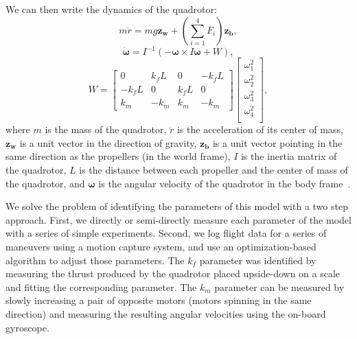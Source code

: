 We can then write the dynamics of the quadrotor:\begin{equation} \label{eq: dynamics_1}
m\ddot{r} = mg\boldsymbol{z_{w}} + (\sum_{i=1}^{4}F_{i})\boldsymbol{z_{b}},
\end{equation}\begin{equation} \label{eq: dynamics_2}
\boldsymbol{\dot{\omega}} = I_{}^{-1}(-\boldsymbol{\omega} \times I\boldsymbol{\omega} + W),
\end{equation}\begin{equation} \label{eq: dynamics_3}
W = \begin{bmatrix}
0 & k_{f}L & 0  & -k_{f}L \\ 
-k_{f}L & 0 & k_{f}L  &  0\\ 
k_m & -k_m & k_m & -k_m
\end{bmatrix}\begin{bmatrix}
\omega_{1}^2\\ 
\omega_{2}^2\\ 
\omega_{3}^2\\ 
\omega_{4}^2\\
\end{bmatrix},
\end{equation}where $m$ is the mass of the quadrotor, $\ddot{r}$ is the acceleration of its center of mass, $\boldsymbol{z_w}$ is a unit vector in the direction of gravity, $\boldsymbol{z_b}$ is a unit vector pointing in the same direction as the propellers (in the world frame), $I$ is the inertia matrix of the quadrotor, $L$ is the distance between each propeller and the center of mass of the quadrotor, and $\boldsymbol{\omega}$ is the angular velocity of the quadrotor in the body frame~\cite{richter2013polynomial}. 

We solve the problem of identifying the parameters of
this model with a two step approach. First, we directly or
semi-directly measure each parameter of the model with a
series of simple experiments. Second, we log flight data for a
series of maneuvers using a motion capture system, and use
an optimization-based algorithm to adjust those parameters. The $k_f$ parameter was identified by measuring the thrust
produced by the quadrotor placed upside-down on a scale and
fitting the corresponding parameter. The $k_m$ parameter can
be measured by slowly increasing a pair of opposite motors
(motors spinning in the same direction) and measuring the
resulting angular velocities using the on-board gyroscope. 

